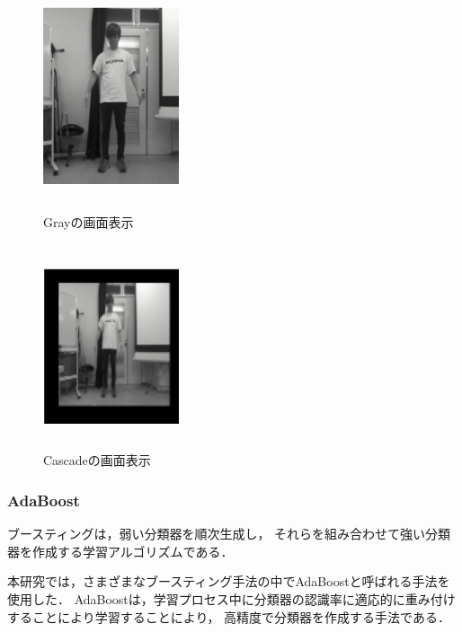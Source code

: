 \begin{figure}[h]
    \begin{minipage}{0.5\hsize}
     \begin{center}
      \includegraphics[width=4cm,height=6cm]{image/gray.png}
     \end{center}
     \caption{Grayの画面表示}
     \label{gray}
    \end{minipage}
    \begin{minipage}{0.5\hsize}
     \begin{center}
      \includegraphics[width=4cm,height=6cm]{image/cascade.png}
     \end{center}
     \caption{Cascadeの画面表示}
     \label{cascade}
    \end{minipage}
\end{figure}

\newpage

\subsubsection{AdaBoost}
ブースティングは，弱い分類器を順次生成し，
それらを組み合わせて強い分類器を作成する学習アルゴリズムである\cite{boosting}．

本研究では，さまざまなブースティング手法の中でAdaBoostと呼ばれる手法を使用した．
AdaBoostは，学習プロセス中に分類器の認識率に適応的に重み付けすることにより学習することにより，
高精度で分類器を作成する手法である\cite{adaboost}．

